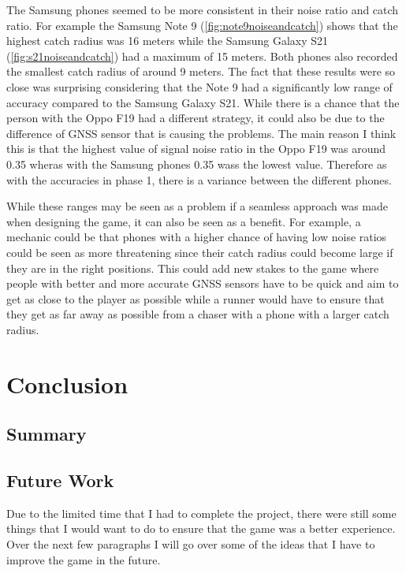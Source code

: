 \documentclass{l4proj}
\begin{document}
The Samsung phones seemed to be more consistent in their noise ratio and catch ratio. For example the Samsung Note 9 (\ref{fig:note9noiseandcatch})
shows that the highest catch radius was 16 meters while the Samsung Galaxy S21 (\ref{fig:s21noiseandcatch}) had a maximum of 15 meters. Both phones
also recorded the smallest catch radius of around 9 meters. The fact that these results were so close was surprising considering that the Note 9
had a significantly low range of accuracy compared to the Samsung Galaxy S21. While there is a chance that the person with the Oppo F19 had a different
strategy, it could also be due to the difference of GNSS sensor that is causing the problems. The main reason I think this is that the highest
value of signal noise ratio in the Oppo F19 was around 0.35 wheras with the Samsung phones 0.35 wass the lowest value. Therefore as with the accuracies
in phase 1, there is a variance between the different phones.

While these ranges may be seen as a problem if a seamless approach was made when designing the game, it can also be seen as a benefit. For
example, a mechanic could be that phones with a higher chance of having low noise ratios could be seen as more threatening since their catch
radius could become large if they are in the right positions. This could add new stakes to the game where people with better and more accurate
GNSS sensors have to be quick and aim to get as close to the player as possible while a runner would have to ensure that they get as far away
as possible from a chaser with a phone with a larger catch radius. 

\chapter{Conclusion}
\section{Summary}

\section{Future Work}
Due to the limited time that I had to complete the project, there were still some things that I would want to do
to ensure that the game was a better experience. Over the next few paragraphs I will go over some of the ideas
that I have to improve the game in the future.
\end{document}
